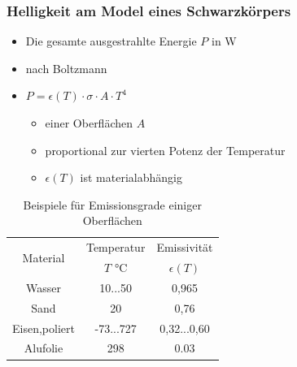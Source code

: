 \documentclass{beamer}
\begin{document}
\begin{frame}[t]\frametitle{Helligkeit am Model eines Schwarzkörpers }
     \begin{itemize}
     \item \footnotesize Die gesamte ausgestrahlte Energie $P$ in \si{\watt}
     \item \footnotesize nach Boltzmann 
     \item $P = \epsilon(T) \cdot \sigma \cdot A \cdot T^4$
     \begin{itemize}
        \item \footnotesize einer Oberflächen $A$
       \item \footnotesize  proportional zur vierten Potenz der Temperatur
      \item  \footnotesize $\epsilon(T)$ ist materialabhängig
      \end{itemize}    
     \end{itemize}
     \pause
   \begin{table}[!h]
\centering
      \begin{tabular}{ccc}
\toprule
\multirow{2}{*}{Material}&   Temperatur &  Emissivität  \\
& $T$ \si{\celsius}& $\epsilon(T)$\\
\midrule
 Wasser  & 10...50 &0,965  \\
 Sand & 20& 0,76\\
 Eisen,poliert & -73...727 & 0,32...0,60 \\
 Alufolie & 298 & 0.03 \\
\bottomrule
\end{tabular}
\caption{Beispiele für Emissionsgrade einiger Oberflächen}
\end{table}


\end{frame}
\end{document}
